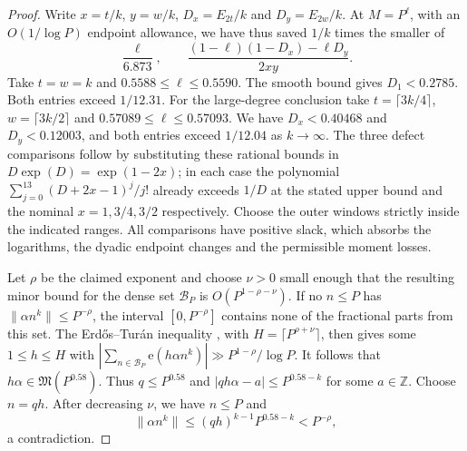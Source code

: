 \documentclass[11pt,letterpaper]{article}
\theoremstyle{definition}
\newcommand{\Z}{\mathbb Z}
\newcommand{\M}{\mathfrak M}
\newcommand{\e}{\mathrm e}
\begin{document}
\begin{proof}
Write $x=t/k$, $y=w/k$, $D_x=E_{2t}/k$ and $D_y=E_{2w}/k$.
At $M=P^\ell$, with an $O(1/\log P)$ endpoint allowance, we have
thus saved $1/k$ times the smaller of
\[
 \frac{\ell}{6.873},\qquad
 \frac{(1-\ell)(1-D_x)-\ell D_y}{2xy}.
\]
Take $t=w=k$ and $0.5588\le\ell\le0.5590$. The smooth bound gives
$D_1<0.2785$. Both entries exceed $1/12.31$. For the large-degree
conclusion take $t=\lceil3k/4\rceil$, $w=\lceil3k/2\rceil$ and
$0.57089\le\ell\le0.57093$. We have $D_x<0.40468$ and
$D_y<0.12003$, and both entries exceed $1/12.04$ as $k\to\infty$.
The three defect comparisons follow by substituting these rational
bounds in $D\exp(D)=\exp(1-2x)$; in each case the polynomial
$\sum_{j=0}^{13}(D+2x-1)^j/j!$ already exceeds $1/D$ at the
stated upper bound and the nominal $x=1,3/4,3/2$ respectively.
Choose the outer windows strictly inside the indicated ranges.
All comparisons have positive slack, which absorbs the logarithms,
the dyadic endpoint changes and the permissible moment losses.

Let $\rho$ be the claimed exponent and choose $\nu>0$ small enough
that the resulting minor bound for the dense set $\mathcal B_P$ is
$O(P^{1-\rho-\nu})$. If no $n\le P$ has
$\|\alpha n^k\|\le P^{-\rho}$, the interval $[0,P^{-\rho}]$
contains none of the fractional parts from this set.
The Erd\H{o}s--Tur\'an inequality \cite[Ch.~2, Theorem 2.5]{KN},
with $H=\lceil P^{\rho+\nu}\rceil$, then gives some $1\le h\le H$
with $|\sum_{n\in\mathcal B_P}\e(h\alpha n^k)|\gg P^{1-\rho}/\log P$.
It follows that $h\alpha\in\M(P^{0.58})$. Thus $q\le P^{0.58}$ and
$|qh\alpha-a|\le P^{0.58-k}$ for some $a\in\Z$. Choose $n=qh$.
After decreasing $\nu$, we have $n\le P$ and
\[
 \|\alpha n^k\|\le (qh)^{k-1}P^{0.58-k}<P^{-\rho},
\]
a contradiction.
\end{proof}
\end{document}
